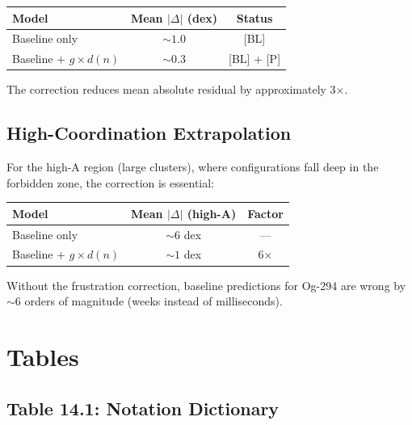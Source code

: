 \begin{center}
\begin{tabular}{lcc}
    \toprule
    Model & Mean $|\Delta|$ (dex) & Status \\
    \midrule
    Baseline only & $\sim 1.0$ & [BL] \\
    Baseline $+$ $g \times d(n)$ & $\sim 0.3$ & [BL] + [P] \\
    \bottomrule
\end{tabular}
\end{center}

The correction reduces mean absolute residual by approximately 3$\times$.

\subsection{High-Coordination Extrapolation}

For the high-A region (large clusters), where configurations fall deep in the
forbidden zone, the correction is essential:

\begin{center}
\begin{tabular}{lcc}
    \toprule
    Model & Mean $|\Delta|$ (high-A) & Factor \\
    \midrule
    Baseline only & $\sim 6$ dex & --- \\
    Baseline $+$ $g \times d(n)$ & $\sim 1$ dex & 6$\times$ \\
    \bottomrule
\end{tabular}
\end{center}

Without the frustration correction, baseline predictions for Og-294
are wrong by $\sim 6$ orders of magnitude (weeks instead of milliseconds).
\tagCal

\section{Tables}
\label{sec:frustrated:tables}

\subsection{Table 14.1: Notation Dictionary}

